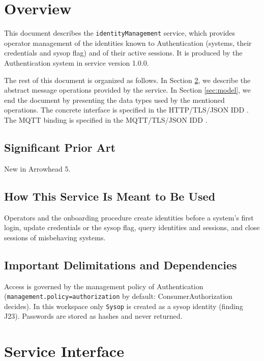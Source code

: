 \documentclass[a4paper]{arrowhead}
\begin{document}
\section{Overview}
\label{sec:overview}

This document describes the \texttt{identityManagement} service, which provides operator management of the identities known to Authentication (systems, their credentials and sysop flag) and of their active sessions.
It is produced by the Authentication system \cite{auth-sysd} in service version 1.0.0.

The rest of this document is organized as follows.
In Section \ref{sec:operations}, we describe the abstract message operations provided by the service.
In Section \ref{sec:model}, we end the document by presenting the data types used by the mentioned operations.
The concrete interface is specified in the HTTP/TLS/JSON IDD \cite{auth-identityManagement-http-idd}. The MQTT binding is specified in the MQTT/TLS/JSON IDD \cite{auth-identityManagement-mqtt-idd}.

\subsection{Significant Prior Art}

New in Arrowhead 5.

\subsection{How This Service Is Meant to Be Used}

Operators and the onboarding procedure create identities before a system's first login, update credentials or the sysop flag, query identities and sessions, and close sessions of misbehaving systems.

\subsection{Important Delimitations and Dependencies}
\label{sec:delimitations}

Access is governed by the management policy of Authentication (\texttt{management.\allowbreak{}policy=\allowbreak{}authorization} by default: Consumer\allowbreak{}Authorization decides). In this workspace only \texttt{Sysop} is created as a sysop identity (finding J23). Passwords are stored as hashes and never returned.

\newpage

\section{Service Interface}
\label{sec:operations}
\end{document}
